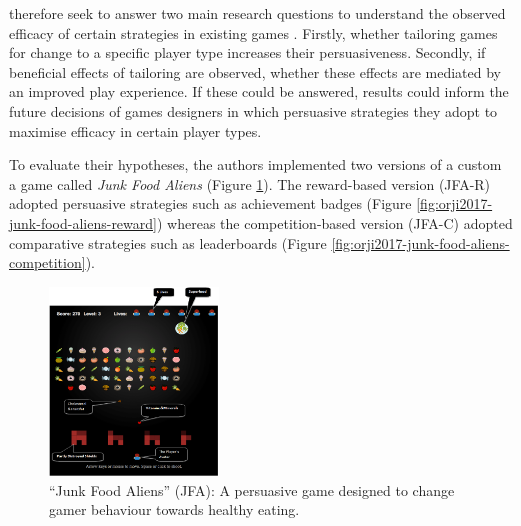 \documentclass[11pt]{article}
\begin{document}
\citet{orji2017} therefore seek to answer two main research questions to understand the observed efficacy of certain strategies in existing games \citep{peng2009,kaipainen2012}. Firstly, whether tailoring games for change to a specific player type increases their persuasiveness. Secondly, if beneficial effects of tailoring are observed, whether these effects are mediated by an improved play experience. If these could be answered, results could inform the future decisions of games designers in which persuasive strategies they adopt to maximise efficacy in certain player types.

To evaluate their hypotheses, the authors implemented two versions of a custom a game called \textit{Junk Food Aliens} (Figure \ref{fig:orji2017-junk-food-aliens}). The reward-based version (JFA-R) adopted persuasive strategies such as achievement badges (Figure \ref{fig:orji2017-junk-food-aliens-reward}) whereas the competition-based version (JFA-C) adopted comparative strategies such as leaderboards (Figure \ref{fig:orji2017-junk-food-aliens-competition}).

\begin{figure}[H]
\centering
\includegraphics[width=0.4\textwidth]{img/orji2017-junk-food-aliens.png} 
\caption{``Junk Food Aliens'' (JFA): A persuasive game designed to change gamer behaviour towards healthy eating.}\label{fig:orji2017-junk-food-aliens}
\end{figure}
\end{document}
